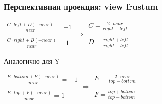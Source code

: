 \documentclass[10pt]{beamer}
\begin{document}
\begin{frame}[fragile]
\frametitle{Перспективная проекция: view frustum}
\begin{center}
\begin{math}
\begin{matrix}
\frac{C\cdot left + D(-near)}{near} = -1 \\ \\
\frac{C\cdot right + D(-near)}{near} = 1
\end{matrix}
\Rightarrow
\begin{matrix}
C = \frac{2\cdot near}{right - left} \\ \\
D = \frac{right + left}{right - left}
\end{matrix}
\end{math}
\end{center}
\pause
Аналогично для Y
\begin{center}
\begin{math}
\begin{matrix}
\frac{E\cdot bottom + F(-near)}{near} = -1 \\ \\
\frac{E\cdot top + F(-near)}{near} = 1
\end{matrix}
\Rightarrow
\begin{matrix}
E = \frac{2\cdot near}{top - bottom} \\ \\
F = \frac{top + bottom}{top - bottom}
\end{matrix}
\end{math}
\end{center}
\end{frame}
\end{document}
